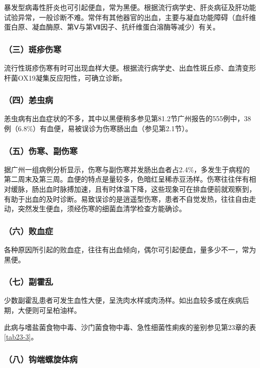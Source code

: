 暴发型病毒性肝炎也可引起便血，常为黑便。根据流行病学史、肝炎病征及肝功能试验异常，一般诊断不难。常伴有其他器官的出血，主要与凝血功能障碍（血纤维蛋白原、凝血酶原、第Ⅴ与第Ⅶ因子、抗纤维蛋白溶酶等减少）有关。

\subsubsection{（三）斑疹伤寒}

流行性斑疹伤寒有时可出现血样大便。根据流行病学史、出血性斑丘疹、血清变形杆菌OX19凝集反应阳性，可确立诊断。

\subsubsection{（四）恙虫病}

恙虫病有出血症状的不多，其中以黑便稍多参见第81.2节广州报告的555例中，38例（6.8\%）有血便，易被误诊为伤寒肠出血（参见第2.1节）。

\subsubsection{（五）伤寒、副伤寒}

据广州一组病例分析显示，伤寒与副伤寒并发肠出血者占2.4\%，多发生于病程的第二周末及第三周。血便的特点是量较多，色暗红呈稀赤豆汤样。伤寒往往伴有相对缓脉，肠出血时脉搏加速，且有时体温下降，这些现象可在排血便前就观察到，有助于出血的及时诊断。易致误诊的是逍遥型伤寒，患者不自觉发热，往往自由走动，突然发生便血，须经伤寒的细菌血清学检查方能确诊。

\subsubsection{（六）败血症}

各种原因所引起的败血症，往往有出血倾向，偶尔可引起便血，量多少不一，常为黑便。

\subsubsection{（七）副霍乱}

少数副霍乱患者可发生血性大便，呈洗肉水样或肉汤样。如出血较多或在疾病后期，大便则可呈柏油样。

此病与嗜盐菌食物中毒、沙门菌食物中毒、急性细菌性痢疾的鉴别参见第23章的表\ref{tab23-3}。

\subsubsection{（八）钩端螺旋体病}

